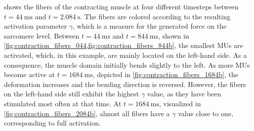  shows the fibers of the contracting muscle at four different timesteps between $t=\SI{44}{\ms}$ and $t=\SI{2.084}{\s}$. The fibers are colored according to the resulting activation parameter $\gamma$, which is a measure for the generated force on the sarcomere level. Between $t=\SI{44}{\ms}$ and $t=\SI{844}{\ms}$, shown in \cref{fig:contraction_fibers_044,fig:contraction_fibers_844b}, the smallest MUs are activated, which, in this example, are mainly located on the left-hand side. As a consequence, the muscle domain initially bends slightly to the left. As more MUs become active at $t=\SI{1684}{\ms}$, depicted in \cref{fig:contraction_fibers_1684b}, the deformation increases and the bending direction is reversed. However, the fibers on the left-hand side still exhibit the highest $\gamma$ value, as they have been stimulated most often at that time.
At $t=\SI{1684}{\ms}$, visualized in \cref{fig:contraction_fibers_2084b}, almost all fibers have a $\gamma$ value close to one, corresponding to full activation.

